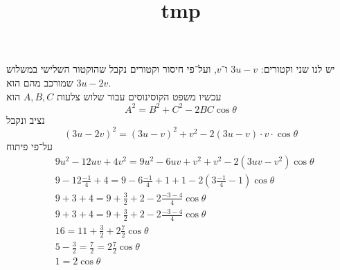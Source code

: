 
\title{tmp}



יש לנו שני וקטורים: $3u - v$ ו־$v$, ועל־פי חיסור וקטורים נקבל שהוקטור השלישי במשלוש שמורכב מהם הוא $3u - 2v$. \\
עכשיו משפט הקוסינוסים עבור שלוש צלעות $A, B, C$ הוא
\[
	A^2 = B^2 + C^2 - 2 BC \cos \theta
\]
נציב ונקבל
\[
	{(3u - 2v)}^2 = {(3u - v)}^2 + v^2 - 2 (3u - v) \cdot v \cdot \cos \theta
\]
על־פי פיתוח
\begin{align*}
	& 9u^2 - 12uv + 4v^2 = 9u^2 - 6uv + v^2 + v^2 - 2(3uv - v^2) \cos \theta \\
	& 9 - 12 \frac{-1}{4} + 4 = 9 - 6 \frac{-1}{4} + 1 + 1 - 2(3 \frac{-1}{4} - 1) \cos \theta \\
	& 9 + 3 + 4 = 9 + \frac{3}{2} + 2 - 2\frac{-3 - 4}{4} \cos \theta \\
	& 9 + 3 + 4 = 9 + \frac{3}{2} + 2 - 2\frac{-3 - 4}{4} \cos \theta \\
	& 16 = 11 + \frac{3}{2} + 2\frac{7}{2} \cos \theta \\
	& 5 - \frac{3}{2} = \frac{7}{2} = 2\frac{7}{2} \cos \theta \\
	& 1 = 2 \cos \theta
\end{align*}



